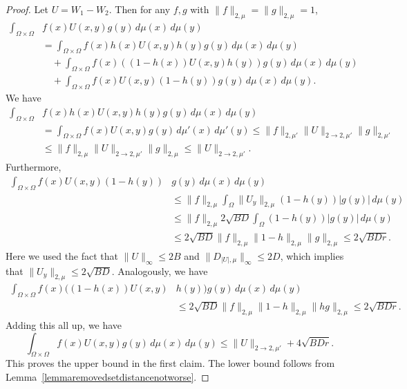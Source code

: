 \documentclass{amsart}
\numberwithin{equation}{section}
\numberwithin{figure}{section}
\theoremstyle{definition}
\theoremstyle{remark}
\begin{document}
\begin{proof}
Let $U=W_1-W_2$. Then for any $f,g$ with $\|f\|_{2,\mu}=\|g\|_{2,\mu}=1$,
\begin{align*}\int_{\Omega \times \Omega}&f(x)U(x,y)g(y) \,d\mu(x)\,d\mu(y)\\
&=\int_{\Omega \times \Omega}f(x)h(x)U(x,y)h(y)g(y)\,d\mu(x)\,d\mu(y)\\
&\quad\phantom{}+\int_{\Omega \times \Omega}f(x)((1-h(x))U(x,y)h(y))g(y)\,d\mu(x)\,d\mu(y)\\
&\quad\phantom{}+\int_{\Omega \times \Omega} f(x)U(x,y)(1-h(y))g(y)\,d\mu(x)\,d\mu(y)
.\end{align*}
We have
\begin{align*}
\int_{\Omega \times \Omega}&f(x)h(x)U(x,y)h(y)g(y)\,d\mu(x)\,d\mu(y)\\
&=\int_{\Omega \times \Omega}f(x)U(x,y)g(y)\,d\mu'(x)\,d\mu'(y)
\le \|f\|_{2,\mu'} \|U\|_{2 \rightarrow 2,\mu'} \|g\|_{2,\mu'}
\\ &\le
\|f\|_{2,\mu} \|U\|_{2 \rightarrow 2,\mu'} \|g\|_{2,\mu}
\le \|U\|_{2 \rightarrow 2,\mu'}.
\end{align*}
Furthermore,
\begin{align*}
\int_{\Omega \times \Omega} f(x)U(x,y)(1-h(y))&g(y)\,d\mu(x)\,d\mu(y)\\
& \le \|f\|_{2,\mu} \int_{\Omega}\|U_y\|_{2,\mu} (1-h(y))|g(y)| \,d\mu(y)\\
&\le \|f\|_{2,\mu} {2 \sqrt{BD}} \int_\Omega (1-h(y))|g(y)| \,d\mu(y)\\
& \le{2 \sqrt{BD}} \|f\|_{2,\mu}\|1-h\|_{2,\mu} \|g\|_{2,\mu}
\le {2\sqrt{BDr}}.
\end{align*}
Here we used the fact that $\|U\|_\infty \le
{2B}$ and $\|D_{|U|,\mu}\|_\infty \le 2D$, which implies that $\|U_y\|_{2,\mu}
\le {2 \sqrt{BD}}$. Analogously, we have
\begin{align*}
\int_{\Omega \times\Omega}
f(x)((1-h(x))U(x,y)&h(y))g(y) \,d\mu(x)\,d\mu(y)\\
 &\le {2 \sqrt{BD}}
\|f\|_{2,\mu} \|1-h\|_{2,\mu} \|hg\|_{2,\mu}
\le {2 \sqrt{BDr}}.\
\end{align*}
Adding this all up, we have
\[\int_{\Omega \times \Omega}f(x)U(x,y)g(y) \,d\mu(x) \,d\mu(y) \le \|U\|_{2 \rightarrow 2,\mu'}
+4 \sqrt{BDr}
.\]
This proves the upper bound in the first claim. The lower bound follows from Lemma~\ref{lemmaremovedsetdistancenotworse}.


\end{proof}
\end{document}
